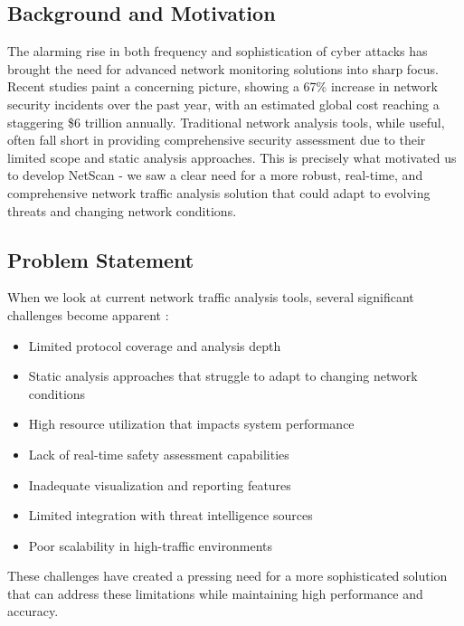 \documentclass[conference]{IEEEtran}
\newcommand{\netscan}{NetScan}
\begin{document}
\subsection{Background and Motivation}
The alarming rise in both frequency and sophistication of cyber attacks has brought the need for advanced network monitoring solutions into sharp focus. Recent studies \cite{ref1,ref2} paint a concerning picture, showing a 67\% increase in network security incidents over the past year, with an estimated global cost reaching a staggering \$6 trillion annually. Traditional network analysis tools, while useful, often fall short in providing comprehensive security assessment due to their limited scope and static analysis approaches. This is precisely what motivated us to develop \netscan{} - we saw a clear need for a more robust, real-time, and comprehensive network traffic analysis solution that could adapt to evolving threats and changing network conditions.

\subsection{Problem Statement}
When we look at current network traffic analysis tools, several significant challenges become apparent \cite{ref3,ref4}:
\begin{itemize}[leftmargin=*]
    \item Limited protocol coverage and analysis depth
    \item Static analysis approaches that struggle to adapt to changing network conditions
    \item High resource utilization that impacts system performance
    \item Lack of real-time safety assessment capabilities
    \item Inadequate visualization and reporting features
    \item Limited integration with threat intelligence sources
    \item Poor scalability in high-traffic environments
\end{itemize}

These challenges have created a pressing need for a more sophisticated solution that can address these limitations while maintaining high performance and accuracy.
\end{document}

